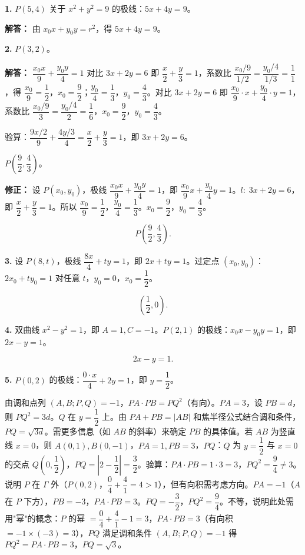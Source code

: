 \documentclass[12pt,a4paper]{ctexart}
\theoremstyle{definition}
\begin{document}
\begin{knowledgebox}[练习题答案]

\textbf{1.} $P(5,4)$ 关于 $x^2+y^2=9$ 的极线：$5x+4y=9$。

\textbf{解答：} 由 $x_0 x+y_0 y=r^2$，得 $5x+4y=9$。

\medskip

\textbf{2.} $P(3,2)$。

\textbf{解答：} $\dfrac{x_0 x}{9}+\dfrac{y_0 y}{4}=1$ 对比 $3x+2y=6$ 即 $\dfrac{x}{2}+\dfrac{y}{3}=1$，系数比 $\dfrac{x_0/9}{1/2}=\dfrac{y_0/4}{1/3}=\dfrac{1}{1}$，得 $\dfrac{x_0}{9}=\dfrac{1}{2}$，$x_0=\dfrac{9}{2}$；$\dfrac{y_0}{4}=\dfrac{1}{3}$，$y_0=\dfrac{4}{3}$。对比 $3x+2y=6$ 即 $\dfrac{x_0}{9}\cdot x+\dfrac{y_0}{4}\cdot y=1$，系数比 $\dfrac{x_0/9}{3}=\dfrac{y_0/4}{2}=\dfrac{1}{6}$，$x_0=\dfrac{9}{2}$，$y_0=\dfrac{4}{3}$。

验算：$\dfrac{9x/2}{9}+\dfrac{4y/3}{4}=\dfrac{x}{2}+\dfrac{y}{3}=1$，即 $3x+2y=6$。

$P\!\left(\dfrac{9}{2},\dfrac{4}{3}\right)$。

\textbf{修正：} 设 $P(x_0,y_0)$，极线 $\dfrac{x_0 x}{9}+\dfrac{y_0 y}{4}=1$，即 $\dfrac{x_0}{9}x+\dfrac{y_0}{4}y=1$。$l:\;3x+2y=6$，即 $\dfrac{x}{2}+\dfrac{y}{3}=1$。所以 $\dfrac{x_0}{9}=\dfrac{1}{2}$，$\dfrac{y_0}{4}=\dfrac{1}{3}$。$x_0=\dfrac{9}{2}$，$y_0=\dfrac{4}{3}$。

\[
  \boxed{P\!\left(\frac{9}{2},\frac{4}{3}\right).}
\]

\medskip

\textbf{3.} 设 $P(8,t)$，极线 $\dfrac{8x}{4}+ty=1$，即 $2x+ty=1$。过定点 $(x_0,y_0)$：$2x_0+ty_0=1$ 对任意 $t$，$y_0=0$，$x_0=\dfrac{1}{2}$。

\[
  \boxed{\left(\frac{1}{2},0\right).}
\]

\medskip

\textbf{4.} 双曲线 $x^2-y^2=1$，即 $A=1,C=-1$。$P(2,1)$ 的极线：$x_0 x-y_0 y=1$，即 $2x-y=1$。

\[
  \boxed{2x-y=1.}
\]

\medskip

\textbf{5.} $P(0,2)$ 的极线：$\dfrac{0\cdot x}{4}+2y=1$，即 $y=\dfrac{1}{2}$。

由调和点列 $(A,B;P,Q)=-1$，$PA\cdot PB=PQ^2$（有向）。$PA=3$，设 $PB=d$，则 $PQ^2=3d$。$Q$ 在 $y=\dfrac{1}{2}$ 上。由 $PA+PB=|AB|$ 和焦半径公式结合调和条件，$PQ=\sqrt{3d}$。需更多信息（如 $AB$ 的斜率）来确定 $PB$ 的具体值。若 $AB$ 为竖直线 $x=0$，则 $A(0,1),B(0,-1)$，$PA=1,PB=3$，$PQ$：$Q$ 为 $y=\dfrac{1}{2}$ 与 $x=0$ 的交点 $Q(0,\dfrac{1}{2})$，$PQ=|2-\dfrac{1}{2}|=\dfrac{3}{2}$。验算：$PA\cdot PB=1\cdot3=3$，$PQ^2=\dfrac{9}{4}\neq3$。说明 $P$ 在 $\Gamma$ 外（$P(0,2)$，$\dfrac{0}{4}+\dfrac{4}{1}=4>1$），但有向积需考虑方向。$PA=-1$（$A$ 在 $P$ 下方），$PB=-3$，$PA\cdot PB=3$。$PQ=-\dfrac{3}{2}$，$PQ^2=\dfrac{9}{4}$。不等，说明此处需用"幂"的概念：$P$ 的幂 $=\dfrac{0}{4}+\dfrac{4}{1}-1=3$，$PA\cdot PB=3$（有向积$=-1\times(-3)=3$），$PQ$ 满足调和条件 $(A,B;P,Q)=-1$ 得 $PQ^2=PA\cdot PB=3$，$PQ=\sqrt{3}$。


\end{knowledgebox}
\end{document}
